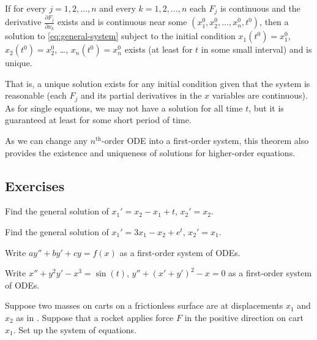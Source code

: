\begin{theorem}%
\label{sys:picardthm}%
If for every $j=1,2,\ldots,n$ and every
$k = 1,2,\ldots,n$
each $F_j$ is continuous
and the derivative
$\frac{\partial F_j}{\partial x_k}$ exists and is
continuous near some $(x_1^0,x_2^0,\ldots,x_n^0,t^0)$, then a solution to
\eqref{eq:general-system}
subject to the initial condition
$x_1(t^0) = x_1^0$,
$x_2(t^0) = x_2^0$, \ldots,
$x_n(t^0) = x_n^0$
exists (at least for $t$ in some small interval) and is unique.
\end{theorem}

That is, a unique solution exists for any initial condition
given that the system is reasonable (each $F_j$ and its partial derivatives
in the $x$ variables are continuous).  As for single equations,
we may not have a solution for all time $t$, but it
is guaranteed at least for some 
short period of time.

As we can change any $n^{\text{th}}$-order ODE into
a first-order system,
this theorem also provides the
existence and uniqueness of solutions for higher-order equations.

\subsection{Exercises}

\begin{exercise}
Find the general solution of $x_1' = x_2 - x_1 + t$, $x_2' = x_2$.
\end{exercise}

\begin{exercise}
Find the general solution of $x_1' = 3 x_1 - x_2 + e^t$, $x_2' = x_1$.
\end{exercise}

\begin{exercise}
Write $ay'' + by' + cy = f(x)$
as a first-order system of ODEs.
\end{exercise}

\begin{exercise}
Write $x'' + y^2 y' - x^3 = \sin(t)$, 
$y'' + {(x'+y')}^2 -x = 0$ as a first-order system of ODEs.
\end{exercise}

\begin{exercise}
Suppose two masses on carts on a frictionless surface are at 
displacements $x_1$ and $x_2$ as in .
Suppose that a rocket applies force $F$ in the positive direction on cart
$x_1$.  Set up the system of equations.
\end{exercise}

